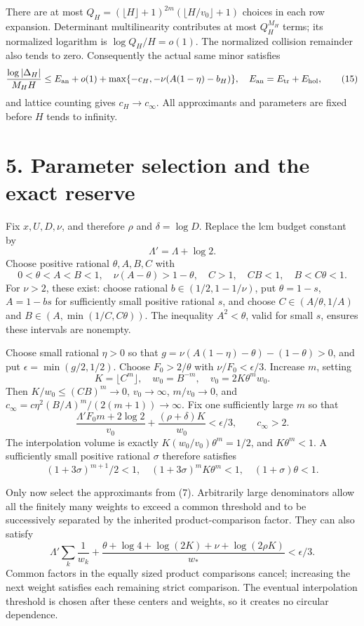 \documentclass[11pt]{article}
\begin{document}
There are at most
\(Q_H=(\lfloor H\rfloor+1)^{2m}(\lfloor H/v_0\rfloor+1)\) choices in
each row expansion. Determinant multilinearity contributes at most
\(Q_H^{M_H}\) terms; its normalized logarithm is \(\log Q_H/H=o(1)\).
The normalized collision remainder also tends to zero. Consequently the
actual same minor satisfies \[
\frac{\log|\Delta_H|}{M_HH}\le
E_{\rm an}+o(1)+
\max\{-c_H,-\nu(A(1-\eta)-b_H)\},
\quad E_{\rm an}=E_{\rm tr}+E_{\rm hol},
\tag{15}
\] and lattice counting gives \(c_H\to c_\infty\). All approximants and
parameters are fixed before \(H\) tends to infinity.

\section{5. Parameter selection and the exact
reserve}\label{parameter-selection-and-the-exact-reserve}

Fix \(x,U,D,\nu\), and therefore \(\rho\) and \(\delta=\log D\). Replace
the lcm budget constant by \[
\Lambda'=\Lambda+\log2.
\] Choose positive rational \(\theta,A,B,C\) with \[
0<\theta<A<B<1,\quad \nu(A-\theta)>1-\theta,
\quad C>1,\quad CB<1,\quad B<C\theta<1.
\tag{16}
\] For \(\nu>2\), these exist: choose rational \(b\in(1/2,1-1/\nu)\),
put \(\theta=1-s\), \(A=1-bs\) for sufficiently small positive rational
\(s\), and choose \(C\in(A/\theta,1/A)\) and
\(B\in(A,\min(1/C,C\theta))\). The inequality \(A^2<\theta\), valid for
small \(s\), ensures these intervals are nonempty.

Choose small rational \(\eta>0\) so that
\(g=\nu(A(1-\eta)-\theta)-(1-\theta)>0\), and put
\(\epsilon=\min(g/2,1/2)\). Choose \(F_0>2/\theta\) with
\(\nu/F_0<\epsilon/3\). Increase \(m\), setting \[
K=\lfloor C^m\rfloor,\quad w_0=B^{-m},\quad v_0=2K\theta^mw_0.
\] Then \(K/w_0\le(CB)^m\to0\), \(v_0\to\infty\), \(m/v_0\to0\), and
\(c_\infty=c\eta^2(B/A)^m/(2(m+1))\to\infty\). Fix one sufficiently
large \(m\) so that \[
\frac{\Lambda'F_0m+2\log2}{v_0}+\frac{(\rho+\delta)K}{w_0}<\epsilon/3,
\qquad c_\infty>2.
\tag{17}
\] The interpolation volume is exactly \(K(w_0/v_0)\theta^m=1/2\), and
\(K\theta^m<1\). A sufficiently small positive rational \(\sigma\)
therefore satisfies \[
(1+3\sigma)^{m+1}/2<1,\quad
(1+3\sigma)^mK\theta^m<1,\quad (1+\sigma)\theta<1.
\]

Only now select the approximants from (7). Arbitrarily large
denominators allow all the finitely many weights to exceed a common
threshold and to be successively separated by the inherited
product-comparison factor. They can also satisfy \[
\Lambda'\sum_k\frac1{w_k}+
\frac{\theta+\log4+\log(2K)+\nu+\log(2\rho K)}{w_*}<\epsilon/3.
\tag{18}
\] Common factors in the equally sized product comparisons cancel;
increasing the next weight satisfies each remaining strict comparison.
The eventual interpolation threshold is chosen after these centers and
weights, so it creates no circular dependence.
\end{document}
